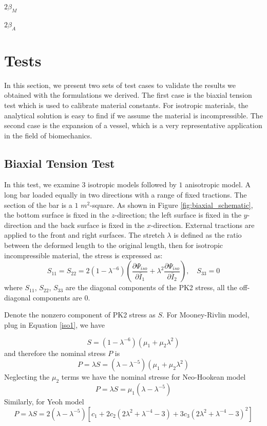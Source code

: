 $2\beta_M$

$2\beta_A$

\section{Tests}
In this section, we present two sets of test cases to validate the results we obtained with the formulations we derived. The first case is the biaxial tension test which is used to calibrate material constants. For isotropic materials, the analytical solution is easy to find if we assume the material is incompressible. The second case is the expansion of a vessel, which is a very representative application in the field of biomechanics.  

\subsection{Biaxial Tension Test}
\label{biaxial_tension_test}
In this test, we examine $3$ isotropic models followed by $1$ anisotropic model. A long bar loaded equally in two directions with a range of fixed tractions. The section of the bar is a $1$ $m^2$-square. As shown in Figure \ref{fig:biaxial_schematic}, the bottom surface is fixed in the $z$-direction; the left surface is fixed in the $y$-direction and the back surface is fixed in the $x$-direction. External tractions are applied to the front and right surfaces. The stretch $\lambda$ is defined as the ratio between the deformed length to the original length, then for isotropic incompressible material, the stress is expressed as:
\begin{equation}
S_{11} = S_{22} = 2(1 - {\lambda}^{-6})(\frac{\partial\Psi_{iso}}{\partial\bar{I}_1} + {\lambda}^2\frac{\partial\Psi_{iso}}{\partial\bar{I}_2}), \quad S_{33} = 0
\end{equation}
where $S_{11}$, $S_{22}$, $S_{33}$ are the diagonal components of the PK2 stress, all the off-diagonal components are $0$.

Denote the nonzero component of PK2 stress as $S$. For Mooney-Rivlin model, plug in Equation \ref{iso1}, we have

\begin{equation}
S = (1 - {\lambda}^{-6})(\mu_1 + \mu_2{\lambda}^2)
\end{equation}
and therefore the nominal stress $P$ is
\begin{equation}
P = \lambda S =  (\lambda - {\lambda}^{-5})(\mu_1 + \mu_2{\lambda}^2)
\end{equation}
Neglecting the $\mu_2$ terms we have the nominal stresse for Neo-Hookean model
\begin{equation}
P = \lambda S =  \mu_1(\lambda - {\lambda}^{-5})
\end{equation}
Similarly, for Yeoh model
\begin{equation}
P = \lambda S = 2(\lambda - {\lambda}^{-5})[c_1 + 2c_2(2{\lambda}^2 + {\lambda}^{-4} - 3) + 3c_3(2{\lambda}^2 + {\lambda}^{-4} - 3)^2]
\end{equation}

